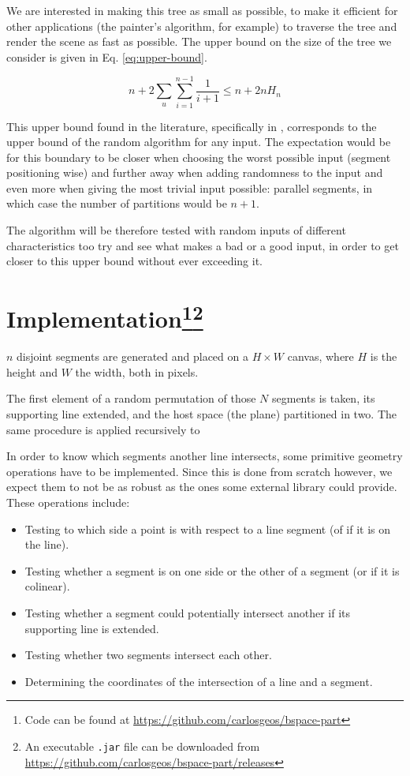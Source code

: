 \documentclass[12pt,a4paper]{article}
\begin{document}
We are interested in making this tree as small as possible, to make it
efficient for other applications (the painter's algorithm, for
example) to traverse the tree and render the scene as fast as
possible. The upper bound on the size of the tree we consider is given
in Eq. \ref{eq:upper-bound}.

\begin{equation}
  \label{eq:upper-bound}
  n + 2 \sum_u \sum_{i=1}^{n-1} \frac{1}{i+1} \leq n + 2nH_n
\end{equation}

This upper bound found in the literature, specifically in
\cite{Motwani:1995:RA:211390}, corresponds to the upper bound of the
random algorithm for any input. The expectation would be for this
boundary to be closer when choosing the worst possible input (segment
positioning wise) and further away when adding randomness to the input
and even more when giving the most trivial input possible: parallel
segments, in which case the number of partitions would be $n+1$.

The algorithm will be therefore tested with random inputs of different
characteristics too try and see what makes a bad or a good input, in
order to get closer to this upper bound without ever exceeding it.

\section[Implementation]{Implementation\footnote{Code can be found at
    \url{https://github.com/carlosgeos/bspace-part}}\footnote{An
    executable \texttt{.jar} file can be downloaded from
    \url{https://github.com/carlosgeos/bspace-part/releases}}}

$n$ disjoint segments are generated and placed on a $H\times W$
canvas, where $H$ is the height and $W$ the width, both in pixels.

The first element of a random permutation of those $N$ segments is
taken, its supporting line extended, and the host space (the plane)
partitioned in two. The same procedure is applied recursively to

In order to know which segments another line intersects, some
primitive geometry operations have to be implemented. Since this is
done from scratch however, we expect them to not be as robust as the
ones some external library could provide. These operations include:

\begin{itemize}
\item Testing to which side a point is with respect to a line segment
  (of if it is on the line).
\item Testing whether a segment is on one side or the other of a
  segment (or if it is colinear).
\item Testing whether a segment could potentially intersect another if
  its supporting line is extended.
\item Testing whether two segments intersect each other.
\item Determining the coordinates of the intersection of a line and a
  segment.
\end{itemize}
\end{document}
